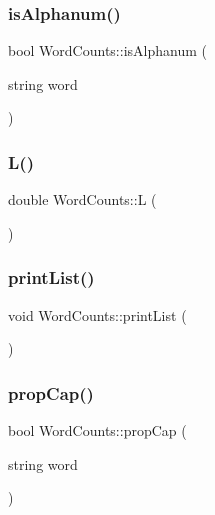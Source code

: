 \subsubsection{\texorpdfstring{is\+Alphanum()}{isAlphanum()}}
{\footnotesize\ttfamily bool Word\+Counts\+::is\+Alphanum (\begin{DoxyParamCaption}\item[{string}]{word }\end{DoxyParamCaption})}

\mbox{\label{class_word_counts_a973557abec8b093a57a048c23b3b35d8}} 
\subsubsection{\texorpdfstring{L()}{L()}}
{\footnotesize\ttfamily double Word\+Counts\+::L (\begin{DoxyParamCaption}{ }\end{DoxyParamCaption})}

\mbox{\label{class_word_counts_a01636133516c8adb1107e9602654fc6c}} 
\subsubsection{\texorpdfstring{print\+List()}{printList()}}
{\footnotesize\ttfamily void Word\+Counts\+::print\+List (\begin{DoxyParamCaption}{ }\end{DoxyParamCaption})}

\mbox{\label{class_word_counts_aaf8065eee6259b08789219146ae5b066}} 
\subsubsection{\texorpdfstring{prop\+Cap()}{propCap()}}
{\footnotesize\ttfamily bool Word\+Counts\+::prop\+Cap (\begin{DoxyParamCaption}\item[{string}]{word }\end{DoxyParamCaption})}

